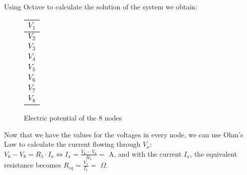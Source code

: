 \fontsize{11}{12}\selectfont
\vspace{20pt}

Using Octave to calculate the solution of the system we obtain:

\begin{figure}[h]
	\begin{center}
	    \begin{minipage}{.3\textwidth}
		\flushright
		\begin{tabular}{|c|}
		    \hline
		    $V_1$ \\
		    \hline
		    $V_2$ \\
		    \hline
		    $V_3$ \\
		    \hline
		    $V_4$ \\
		    \hline
		    $V_5$ \\
		    \hline
		    $V_6$ \\
		    \hline
		    $V_7$ \\
		    \hline
		    $V_8$ \\
		    \hline
		\end{tabular}
	    \end{minipage}
	    \hspace{-8pt}
	    \begin{minipage}{.3\textwidth}
		\flushleft
		
	    \end{minipage}
	\end{center}
	\caption{Electric potential of the 8 nodes}
	\label{theory_voltages}
\end{figure}

Now that we have the values for the voltages in every node, we can use Ohm's Law to calculate the current flowing through $V_x$:
$V_6 - V_8 = R_5 \cdot I_x \iff I_x = \frac{V_6 - V_8}{R_5} = $ A,
and with the current $I_x$, the equivalent resistance becomes $R_{eq} = \frac{V_x}{I_x} =$ $\Omega$.
